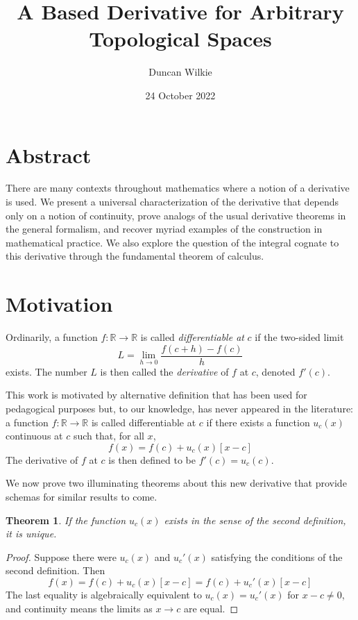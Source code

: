 \documentclass{article}
\title{A Based Derivative for Arbitrary Topological Spaces}
\author{Duncan Wilkie}
\date{24 October 2022}
\newtheorem{thm}{Theorem}
\begin{document}
\maketitle

\section{Abstract}
There are many contexts throughout mathematics where a notion of a derivative is used.
We present a universal characterization of the derivative that depends only on a notion of continuity,
prove analogs of the usual derivative theorems in the general formalism, and recover myriad examples of the construction in mathematical practice.
We also explore the question of the integral cognate to this derivative through the fundamental theorem of calculus.

\section{Motivation}
Ordinarily, a function $f: \mathbb{R} \to \mathbb{R}$ is called \textit{differentiable at} $c$ if the two-sided limit
\[
  L = \lim_{h \to 0}\frac{f(c + h) - f(c)}{h}
\]
exists.
The number $L$ is then called the \textit{derivative} of $f$ at $c$, denoted $f'(c)$.

This work is motivated by alternative definition that has been used for pedagogical purposes but, to our knowledge, has never appeared in the literature:
a function $f: \mathbb{R} \to \mathbb{R}$ is called differentiable at $c$ if there exists a function $u_{c}(x)$ continuous at $c$ such that, for all $x$,
\[
  f(x) = f(c) + u_{c}(x)[x - c]
\]
The derivative of $f$ at $c$ is then defined to be $f'(c) = u_{c}(c)$.

We now prove two illuminating theorems about this new derivative that provide schemas for similar results to come.

\begin{thm}
  If the function $u_{c}(x)$ exists in the sense of the second definition, it is unique.
\end{thm}

\begin{proof}
  Suppose there were $u_{c}(x)$ and $u_{c}'(x)$ satisfying the conditions of the second definition.
  Then
  \[
    f(x) = f(c) + u_{c}(x)[x - c] = f(c) + u_{c}'(x)[x - c]
  \]
  The last equality is algebraically equivalent to $u_{c}(x) = u_{c}'(x)$ for $x - c \neq 0$, and continuity means the limits as $x\to c$ are equal.
\end{proof}
\end{document}
